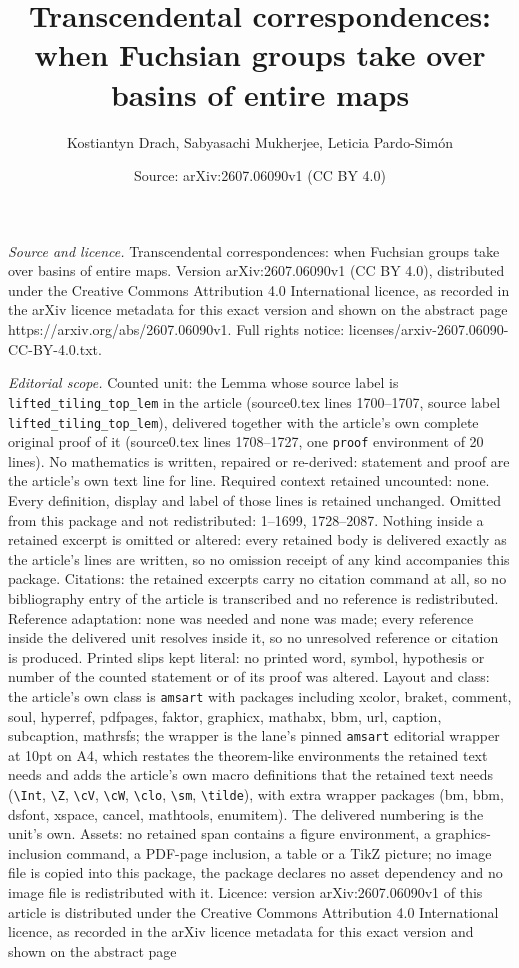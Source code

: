 \documentclass[10pt,a4paper]{amsart}
\title[Transcendental correspondences: when Fuchsian groups take ov]{Transcendental correspondences: when Fuchsian groups take over basins of entire maps}
\author{Kostiantyn Drach, Sabyasachi Mukherjee, Leticia Pardo-Sim\'on}
\date{Source: arXiv:2607.06090v1 (CC BY 4.0)}
\begin{document}
\maketitle

\noindent\emph{Source and licence.} Transcendental correspondences: when Fuchsian groups take over basins of entire maps. Version arXiv:2607.06090v1 (CC BY 4.0), distributed under the Creative Commons Attribution 4.0 International licence, as recorded in the arXiv licence metadata for this exact version and shown on the abstract page https://arxiv.org/abs/2607.06090v1. Full rights notice: licenses/arxiv-2607.06090-CC-BY-4.0.txt.\par\smallskip

\noindent\textit{Editorial scope.} Counted unit: the Lemma whose source label is \texttt{lifted\_tiling\_top\_lem} in the article (source0.tex lines 1700--1707, source label \texttt{lifted\_tiling\_top\_lem}), delivered together with the article's own complete original proof of it (source0.tex lines 1708--1727, one \texttt{proof} environment of 20 lines). No mathematics is written, repaired or re-derived: statement and proof are the article's own text line for line. Required context retained uncounted: none. Every definition, display and label of those lines is retained unchanged. Omitted from this package and not redistributed: 1--1699, 1728--2087. Nothing inside a retained excerpt is omitted or altered: every retained body is delivered exactly as the article's lines are written, so no omission receipt of any kind accompanies this package. Citations: the retained excerpts carry no citation command at all, so no bibliography entry of the article is transcribed and no reference is redistributed. Reference adaptation: none was needed and none was made; every reference inside the delivered unit resolves inside it, so no unresolved reference or citation is produced. Printed slips kept literal: no printed word, symbol, hypothesis or number of the counted statement or of its proof was altered. Layout and class: the article's own class is \texttt{amsart} with packages including xcolor, braket, comment, soul, hyperref, pdfpages, faktor, graphicx, mathabx, bbm, url, caption, subcaption, mathrsfs; the wrapper is the lane's pinned \texttt{amsart} editorial wrapper at 10pt on A4, which restates the theorem-like environments the retained text needs and adds the article's own macro definitions that the retained text needs (\texttt{\textbackslash Int}, \texttt{\textbackslash Z}, \texttt{\textbackslash cV}, \texttt{\textbackslash cW}, \texttt{\textbackslash clo}, \texttt{\textbackslash sm}, \texttt{\textbackslash tilde}), with extra wrapper packages (bm, bbm, dsfont, xspace, cancel, mathtools, enumitem). The delivered numbering is the unit's own. Assets: no retained span contains a figure environment, a graphics-inclusion command, a PDF-page inclusion, a table or a TikZ picture; no image file is copied into this package, the package declares no asset dependency and no image file is redistributed with it. Licence: version arXiv:2607.06090v1 of this article is distributed under the Creative Commons Attribution 4.0 International licence, as recorded in the arXiv licence metadata for this exact version and shown on the abstract page 
\end{document}
